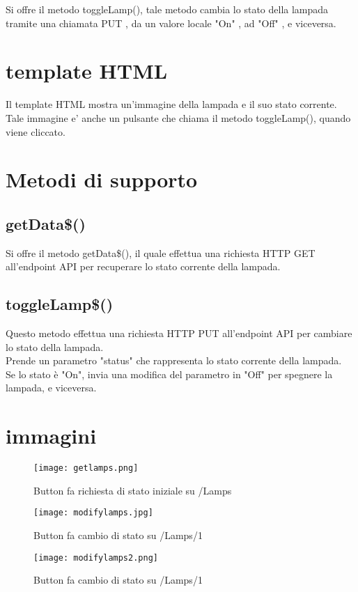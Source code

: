 Si offre il metodo toggleLamp(), tale metodo cambia lo stato della lampada tramite una chiamata PUT , da un valore locale "On" , ad "Off" , e viceversa.

\section{template HTML}
Il template HTML mostra un'immagine della lampada e il suo stato corrente. \\
Tale immagine e' anche un pulsante che chiama il metodo toggleLamp(), quando viene cliccato.

\section{Metodi di supporto}

\subsection{getData\$()}
Si offre il metodo getData\$(), il quale effettua una richiesta HTTP GET all'endpoint API per recuperare lo stato corrente della lampada.

\subsection{toggleLamp\$()}
Questo metodo effettua una richiesta HTTP PUT all'endpoint API per cambiare lo stato della lampada. \\
Prende un parametro "status" che rappresenta lo stato corrente della lampada. \\
Se lo stato è "On", invia una modifica del parametro in "Off" per spegnere la lampada, e viceversa.

\section{immagini}

\begin{figure}[H]
    \centering
    \texttt{[image: getlamps.png]}
    \caption{Button fa richiesta di stato iniziale su /Lamps}
\end{figure}


\begin{figure}[H]
    \centering
    \texttt{[image: modifylamps.jpg]}
    \caption{Button fa cambio di stato su /Lamps/1}
\end{figure}

\begin{figure}[H]
    \centering
    \texttt{[image: modifylamps2.png]}
    \caption{Button fa cambio di stato su /Lamps/1}
\end{figure}
